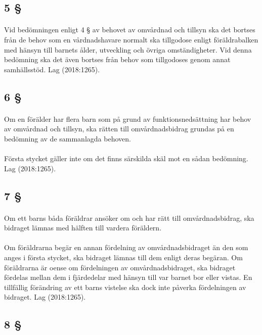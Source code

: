 \documentclass[a4paper,notitlepage,openany,10pt]{book}
\begin{document}
\subsection*{5 §}
\paragraph*{}
Vid bedömningen enligt 4 § av behovet av omvårdnad och tillsyn ska det bortses från de behov som en vårdnadshavare normalt ska tillgodose enligt föräldrabalken med hänsyn till barnets ålder, utveckling och övriga omständigheter. Vid denna bedömning ska det även bortses från behov som tillgodoses genom annat samhällsstöd.
Lag (2018:1265).
\subsection*{6 §}
\paragraph*{}
Om en förälder har flera barn som på grund av funktionsnedsättning har behov av omvårdnad och tillsyn, ska rätten till omvårdnadsbidrag grundas på en bedömning av de sammanlagda behoven.
\paragraph*{}
Första stycket gäller inte om det finns särskilda skäl mot en sådan bedömning.
Lag (2018:1265).
\subsection*{7 §}
\paragraph*{}
Om ett barns båda föräldrar ansöker om och har rätt till omvårdnadsbidrag, ska bidraget lämnas med hälften till vardera föräldern.
\paragraph*{}
Om föräldrarna begär en annan fördelning av omvårdnadsbidraget än den som anges i första stycket, ska bidraget lämnas till dem enligt deras begäran. Om föräldrarna är oense om fördelningen av omvårdnadsbidraget, ska bidraget fördelas mellan dem i fjärdedelar med hänsyn till var barnet bor eller vistas. En tillfällig förändring av ett barns vistelse ska dock inte påverka fördelningen av bidraget.
Lag (2018:1265).
\subsection*{8 §}
\end{document}
